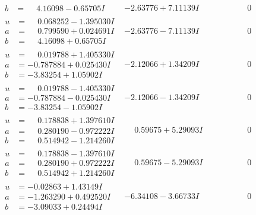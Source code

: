 \documentclass[1p]{elsarticle_modified}
\theoremstyle{definition}
\begin{document}
$$\begin{array}{c|c|c}
\begin{aligned}
b &= \phantom{-}4.16098 - 0.65705 I\end{aligned}
 & -2.63776 + 7.11139 I & \phantom{-0.000000 } 0 \\ \hline\begin{aligned}
u &= \phantom{-}0.068252 - 1.395030 I \\
a &= \phantom{-}0.799590 + 0.024691 I \\
b &= \phantom{-}4.16098 + 0.65705 I\end{aligned}
 & -2.63776 - 7.11139 I & \phantom{-0.000000 } 0 \\ \hline\begin{aligned}
u &= \phantom{-}0.019788 + 1.405330 I \\
a &= -0.787884 + 0.025430 I \\
b &= -3.83254 + 1.05902 I\end{aligned}
 & -2.12066 + 1.34209 I & \phantom{-0.000000 } 0 \\ \hline\begin{aligned}
u &= \phantom{-}0.019788 - 1.405330 I \\
a &= -0.787884 - 0.025430 I \\
b &= -3.83254 - 1.05902 I\end{aligned}
 & -2.12066 - 1.34209 I & \phantom{-0.000000 } 0 \\ \hline\begin{aligned}
u &= \phantom{-}0.178838 + 1.397610 I \\
a &= \phantom{-}0.280190 - 0.972222 I \\
b &= \phantom{-}0.514942 - 1.214260 I\end{aligned}
 & \phantom{-}0.59675 + 5.29093 I & \phantom{-0.000000 } 0 \\ \hline\begin{aligned}
u &= \phantom{-}0.178838 - 1.397610 I \\
a &= \phantom{-}0.280190 + 0.972222 I \\
b &= \phantom{-}0.514942 + 1.214260 I\end{aligned}
 & \phantom{-}0.59675 - 5.29093 I & \phantom{-0.000000 } 0 \\ \hline\begin{aligned}
u &= -0.02863 + 1.43149 I \\
a &= -1.263290 + 0.492520 I \\
b &= -3.09033 + 0.24494 I\end{aligned}
 & -6.34108 - 3.66733 I & \phantom{-0.000000 } 0 \\ \hline\begin{aligned}

\end{aligned}
\end{array}$$
\end{document}
